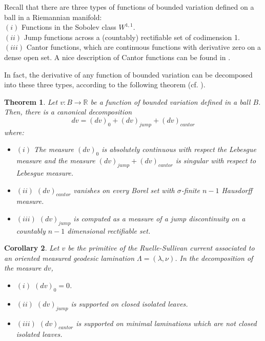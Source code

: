 \documentclass{ip-journal}
\newtheorem{theorem}{Theorem}[section]
\newtheorem{corollary}[theorem]{Corollary}
\theoremstyle{definition}
\numberwithin{equation}{section}
\newcommand{\R}{\mathbb R}
\begin{document}


Recall that there are three types of functions of bounded variation defined on a ball in a Riemannian manifold:\\ 
$(i)$ Functions in the Sobolev class $W^{1,1}$.\\
$(ii)$ Jump functions across a 
(countably) rectifiable set of codimension 1.\\
 $(iii)$ Cantor functions, which are
continuous functions with derivative zero on a dense open set.
  A nice description of Cantor functions can be
found in \cite{cantorexp}. 



In fact, the derivative of any function of bounded variation can be decomposed into these three types, according to the following theorem
(cf. \cite[Theorem 3.78 and Proposition 3.92]{ambrosio}).


\begin{theorem}\label{decocantor1}
Let  $v: B \rightarrow \R$  be a function of bounded variation  defined in a ball $B$. Then, there is a canonical decomposition  
\[
dv = (dv)_0 + (dv)_{jump} + (dv)_{cantor}
\]
where: 
\begin{itemize}
 \item $(i)$ The measure $(dv)_0$ is absolutely continuous with respect the Lebesgue measure
and the measure $(dv)_{jump} + (dv)_{cantor}$ is singular with respect to Lebesgue measure.
\item $(ii)$ $(dv)_{cantor}$  vanishes on  every Borel set  with $\sigma$-finite $n-1$ Hausdorff measure.
\item $(iii)$   $(dv)_{jump}$ is computed as a measure of a jump discontinuity on a countably $n-1$ dimensional rectifiable set.
\end{itemize}
\end{theorem}


\begin{corollary}\label{decocantor2} Let $v$ be the  primitive of the Ruelle-Sullivan current  associated to an oriented measured geodesic lamination
$\Lambda=(\lambda, \nu)$. In the decomposition of the measure $dv$, 
\begin{itemize}
\item $(i)$ $(dv)_0 = 0$.
\item $(ii)$ $(dv)_{jump}$ is supported on closed isolated leaves. 
\item $(iii)$ $(dv)_{cantor}$ is supported on minimal laminations which are not closed isolated leaves.
\end{itemize}
\end{corollary}
\end{document}
